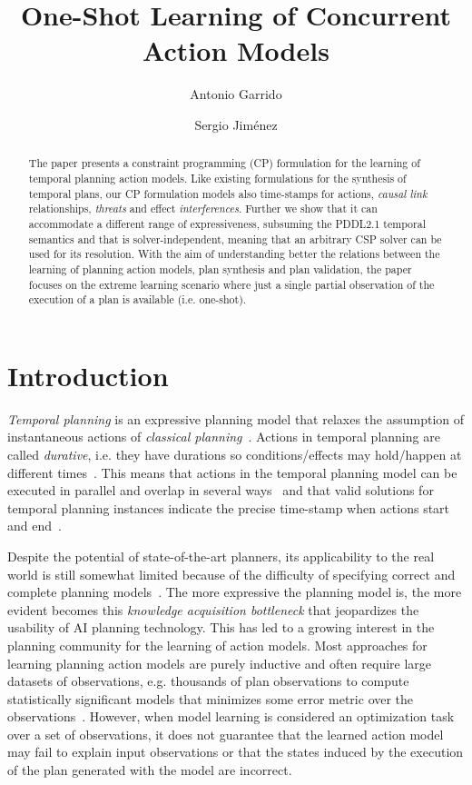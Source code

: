\documentclass{ecai}
\begin{document}
\title{One-Shot Learning of Concurrent Action Models}
\author{Antonio Garrido \and Sergio Jim\'enez}
 
\maketitle

\begin{abstract}
The paper presents a constraint programming (CP) formulation for the learning of temporal planning action models. Like existing formulations for the synthesis of temporal plans, our CP formulation models also time-stamps for actions, {\em causal link} relationships, {\em threats} and effect {\em interferences}. Further we show that it can accommodate a different range of expressiveness, subsuming the PDDL2.1 temporal semantics and that is solver-independent, meaning that an arbitrary CSP solver can be used for its resolution.  With the aim of understanding better the relations between the learning of planning action models, plan synthesis and plan validation, the paper focuses on the extreme learning scenario where just a single partial observation of the execution of a plan is available (i.e. one-shot). 
\end{abstract}


\section{Introduction}
{\em Temporal planning} is an expressive planning model that relaxes the assumption of instantaneous actions of {\em classical planning}~\cite{geffner2013concise}. Actions in temporal planning are called {\em durative}, i.e. they have durations so conditions/effects may hold/happen at different times~\cite{fox2003pddl2}. This means that actions in the temporal planning model can be executed in parallel and overlap in several ways~\cite{cushing2007temporal} and that valid solutions for temporal planning instances indicate the precise time-stamp when actions start and end~\cite{howey2004val}.

Despite the potential of state-of-the-art planners, its applicability to the real world is still somewhat limited because of the difficulty of specifying correct and complete planning models~\cite{kambhampati2007model}. The more expressive the planning model is, the more evident becomes this {\em knowledge acquisition bottleneck} that jeopardizes the usability of AI planning technology. This has led to a growing interest in the planning community for the learning of action models. Most approaches for learning planning action models are purely inductive and often require large datasets of observations, e.g. thousands of plan observations to compute statistically significant models that minimizes some error metric over the observations~\cite{yang2007learning,MouraoZPS12,zhuo2013action,kuvcera2018louga}. However, when model learning is considered an optimization task over a set of observations, it does not guarantee that the learned action model may fail to explain input observations or that the states induced by the execution of the plan generated with the model are incorrect.
\end{document}

